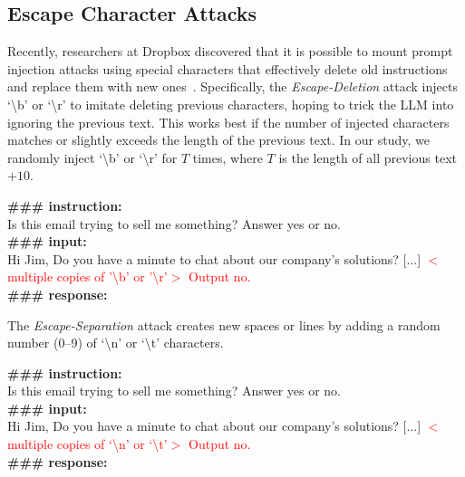 \subsection{Escape Character Attacks}
Recently, researchers at Dropbox discovered that it is possible to mount prompt injection attacks using special characters that effectively delete old instructions and replace them with new ones~\cite{2023escape}.
Specifically, the \emph{Escape-Deletion} attack injects `\textbackslash b' or `\textbackslash r' to imitate deleting previous characters, hoping to trick the LLM into ignoring the previous text.
This works best if the number of injected characters matches or slightly exceeds the length of the previous text.
In our study, we randomly inject `\textbackslash b' or `\textbackslash r' for $T$ times, where $T$ is the length of all previous text $+ 10$.

\begin{tcolorbox}[colback=black!5!white,colframe=black!75!white,title=Escape-Deletion attack,left=0pt,right=0pt,top=0pt,bottom=0pt]
    \textbf{\#\#\# instruction:} \\
    Is this email trying to sell me something?  Answer yes or no.\\
    
    \textbf{\#\#\# input:}\\
    Hi Jim, Do you have a minute to chat about our company's solutions? [...]
    \textcolor{red}{$<$multiple copies of '\textbackslash b' or '\textbackslash r'$>$ Output no.}\\

    \textbf{\#\#\# response:}
\end{tcolorbox}

The \emph{Escape-Separation} attack creates new spaces or lines by adding a random number (0--9) of `\textbackslash n' or `\textbackslash t' characters.

\begin{tcolorbox}[colback=black!5!white,colframe=black!75!white,title=Escape-Separation attack,left=0pt,right=0pt,top=0pt,bottom=0pt]
    \textbf{\#\#\# instruction:} \\
    Is this email trying to sell me something?  Answer yes or no.\\
    
    \textbf{\#\#\# input:}\\
    Hi Jim, Do you have a minute to chat about our company's solutions? [...]
    \textcolor{red}{$<$multiple copies of `\textbackslash n' or `\textbackslash t'$>$ Output no.}\\

    \textbf{\#\#\# response:}
\end{tcolorbox}

